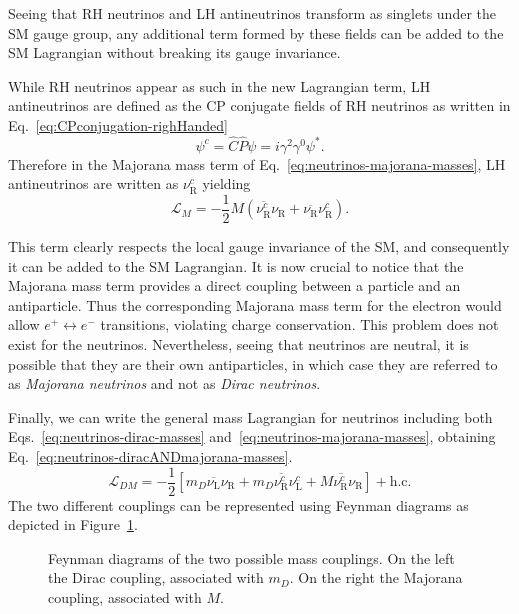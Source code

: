Seeing that \ac{RH} neutrinos and \ac{LH} antineutrinos transform as singlets under the \ac{SM} gauge group, any additional term formed by these fields can be added to the \ac{SM} Lagrangian without breaking its gauge invariance.

While \ac{RH} neutrinos appear as such in the new Lagrangian term, \ac{LH} antineutrinos are defined as the \ac{CP} conjugate fields of \ac{RH} neutrinos as written in Eq.~\ref{eq:CPconjugation-righHanded}
\begin{equation}
    \label{eq:CPconjugation-righHanded}
    \psi^c = \hat{C}\hat{P}\psi = i\gamma^2\gamma^0\psi^*.
\end{equation} 
Therefore in the Majorana mass term of Eq.~\ref{eq:neutrinos-majorana-masses}, \ac{LH} antineutrinos are written as $\nu_\text{R}^c$ yielding
\begin{equation}
    \label{eq:neutrinos-majorana-masses}
    \mathcal{L}_M = -\frac{1}{2} M \left( \overline{\nu_\text{R}^c} \nu_\text{R} + \overline{\nu_\text{R}} \nu_\text{R}^c \right).
\end{equation}
 

This term clearly respects the local gauge invariance of the \ac{SM}, and consequently it can be added to the \ac{SM} Lagrangian. 
It is now crucial to notice that the Majorana mass term provides a direct coupling between a particle and an antiparticle. 
Thus the corresponding Majorana mass term for the electron would allow $e^+ \leftrightarrow e^-$ transitions, violating charge conservation. 
This problem does not exist for the neutrinos. Nevertheless, seeing that neutrinos are neutral, it is possible that they are their own 
antiparticles, in which case they are referred to as \textit{Majorana neutrinos} and not as \textit{Dirac neutrinos}.

Finally, we can write the general mass Lagrangian for neutrinos including both Eqs.~\ref{eq:neutrinos-dirac-masses} 
and~\ref{eq:neutrinos-majorana-masses}, obtaining Eq.~\ref{eq:neutrinos-diracANDmajorana-masses}.
\begin{equation}
    \label{eq:neutrinos-diracANDmajorana-masses}
    \mathcal{L}_{DM} = -\frac{1}{2} \left[ m_D \overline{\nu_\text{L}}\nu_\text{R} + m_D \overline{\nu_\text{R}^c}\nu_\text{L}^c + M \overline{\nu_\text{R}^c}\nu_\text{R} \right] + \text{h.c.}
\end{equation}
The two different couplings can be represented using Feynman diagrams as depicted in Figure~\ref{fig:feynman-massCouplings}.
\begin{figure}[H]
    \centering
    
    \caption{Feynman diagrams of the two possible mass couplings. On the left the Dirac coupling, associated with $m_D$. On the right the Majorana coupling, associated with $M$.}
    \label{fig:feynman-massCouplings}
\end{figure}

